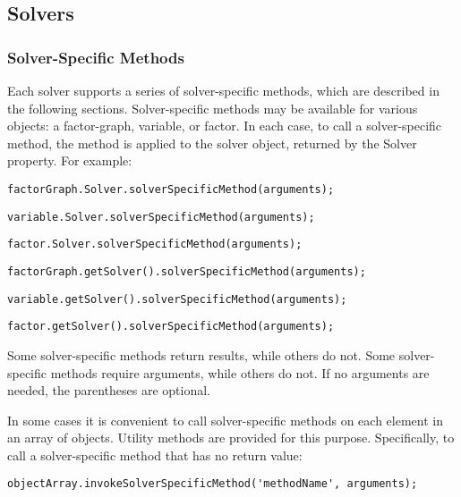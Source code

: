 \subsection{Solvers}
\label{sec:SolversAPI}

\subsubsection{Solver-Specific Methods}

Each solver supports a series of solver-specific methods, which are described in the following sections.  Solver-specific methods may be available for various objects: a factor-graph, variable, or factor.  In each case, to call a solver-specific method, the method is applied to the solver object, returned by the Solver property.  For example:

\ifmatlab
\begin{lstlisting}
factorGraph.Solver.solverSpecificMethod(arguments);
\end{lstlisting}

\begin{lstlisting}
variable.Solver.solverSpecificMethod(arguments);
\end{lstlisting}

\begin{lstlisting}
factor.Solver.solverSpecificMethod(arguments);
\end{lstlisting}
\fi

\ifjava
\begin{lstlisting}
factorGraph.getSolver().solverSpecificMethod(arguments);
\end{lstlisting}

\begin{lstlisting}
variable.getSolver().solverSpecificMethod(arguments);
\end{lstlisting}

\begin{lstlisting}
factor.getSolver().solverSpecificMethod(arguments);
\end{lstlisting}
\fi


Some solver-specific methods return results, while others do not.  Some solver-specific methods require arguments, while others do not.  \ifmatlab If no arguments are needed, the parentheses are optional. \fi

\ifmatlab

In some cases it is convenient to call solver-specific methods on each element in an array of objects.  Utility methods are provided for this purpose.  Specifically, to call a solver-specific method that has no return value:
\begin{lstlisting}
objectArray.invokeSolverSpecificMethod('methodName', arguments);
\end{lstlisting}

